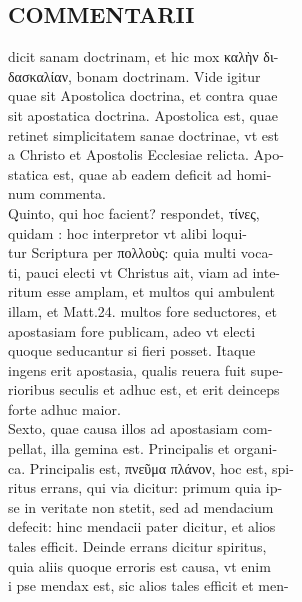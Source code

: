 \documentclass{article}
\begin{document}
\begin{pages}
\section*{COMMENTARII \\
                }
dicit sanam doctrinam, et hic mox καλὴν δι- \\
                δασκαλίαν, bonam doctrinam. Vide igitur \\
                quae sit Apostolica doctrina, et contra quae \\
                sit apostatica doctrina. Apostolica est, quae \\
                retinet simplicitatem sanae doctrinae, vt est \\
                a Christo et Apostolis Ecclesiae relicta. Apo- \\
                statica est, quae ab eadem deficit ad homi- \\
                num commenta. \\
                Quinto, qui hoc facient? respondet, τίνες, \\
                quidam : hoc interpretor vt alibi loqui- \\
                tur Scriptura per πολλοὺς: quia multi voca- \\
                ti, pauci electi vt Christus ait, viam ad inte- \\
                ritum esse amplam, et multos qui ambulent \\
                illam, et Matt.24. multos fore seductores, et \\
                apostasiam fore publicam, adeo vt electi \\
                quoque seducantur si fieri posset. Itaque \\
                ingens erit apostasia, qualis reuera fuit supe- \\
                rioribus seculis et adhuc est, et erit deinceps \\
                forte adhuc maior. \\
                Sexto, quae causa illos ad apostasiam com- \\
                pellat, illa gemina est. Principalis et organi- \\
                ca. Principalis est, πνεῦμα πλάνον, hoc est, spi- \\
                ritus errans, qui via dicitur: primum quia ip- \\
                se in veritate non stetit, sed ad mendacium \\
                defecit: hinc mendacii pater dicitur, et alios \\
                tales efficit. Deinde errans dicitur spiritus, \\
                quia aliis quoque erroris est causa, vt enim \\
                i pse mendax est, sic alios tales efficit et men- \\
                

\end{pages}
\end{document}
